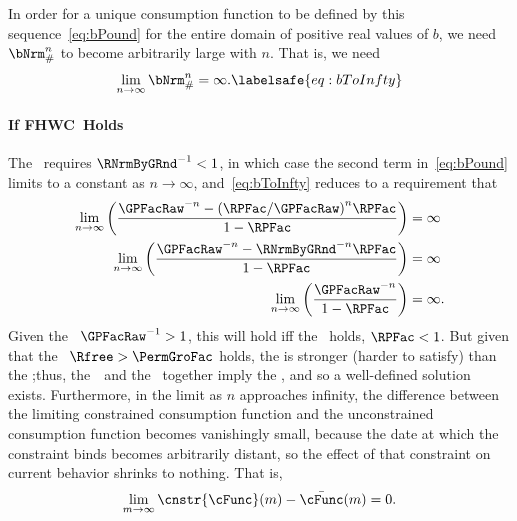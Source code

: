 \documentclass[\econtexRoot/BufferStockTheory]{subfiles}
\begin{document}
In order for a unique consumption function to be defined by this sequence~\eqref{eq:bPound} for the entire domain of positive real values of $b$, we need $\bNrm_{\#}^{n}$ to become arbitrarily large with $n$.
That is, we need
\begin{equation}\begin{gathered}\begin{aligned}
  \lim_{n \rightarrow \infty} \bNrm_{\#}^{n} = \infty. \labelsafe{eq:bToInfty}
\end{aligned}\end{gathered}\end{equation}

\paragraph{If {FHWC}~Holds}
The \FHWC~requires $\RNrmByGRnd^{-1} < 1$, in which case the second term in~\eqref{eq:bPound} limits to a constant as $n \rightarrow \infty$, and~\eqref{eq:bToInfty} reduces to a requirement that
\begin{eqnarray*}
  \lim_{n \rightarrow \infty} \left(\frac{\GPFacRaw^{-n}-{(\RPFac/\GPFacRaw)}^{n}\RPFac}{1-\RPFac}\right)  & = \infty
  \\  \lim_{n \rightarrow \infty} \left(\frac{\GPFacRaw^{-n}-\RNrmByGRnd^{-n}\RPFac}{1-\RPFac}\right)  & = \infty
  \\  \lim_{n \rightarrow \infty} \left(\frac{\GPFacRaw^{-n}}{1-\RPFac}\right)  & = \infty.
\end{eqnarray*}
Given the \GICRaw~$\GPFacRaw^{-1}>1$, this will hold iff the \RIC~holds, $\RPFac < 1$.
But given that the \FHWC~$\Rfree > \PermGroFac$ holds, the {\GICRaw} is stronger (harder to satisfy) than the \RIC;\@ thus, the~\FHWC~and the \GICRaw~together imply the \RIC, and so a well-defined solution exists.
Furthermore, in the limit as $n$ approaches infinity, the difference between the limiting constrained consumption function and the unconstrained consumption function becomes vanishingly small, because the date at which the constraint binds becomes arbitrarily distant, so the effect of that constraint on current behavior shrinks to nothing.
That is,
\begin{equation}\begin{gathered}\begin{aligned}
  \lim_{m \rightarrow \infty}\cnstr{\cFunc}(m) - \bar{\cFunc}(m) = 0.
\end{aligned}\end{gathered}\end{equation}
\end{document}
